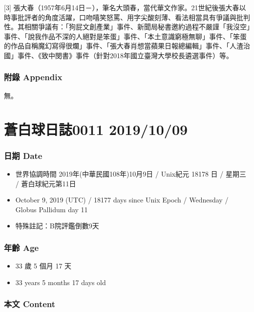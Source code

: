 \documentclass[
]{article}
\providecommand{\tightlist}{%
  \setlength{\itemsep}{0pt}\setlength{\parskip}{0pt}}
\begin{document}
{[}3{]}
張大春（1957年6月14日－），筆名大頭春，當代華文作家。21世紀後張大春以時事批評者的角度活躍，口吻嘻笑怒罵、用字尖酸刻薄、看法相當具有爭議與批判性。其相關爭議有：「狗屁文創產業」事件、新聞局秘書邀約過程不嚴謹「我沒空」事件、「說我作品不深的人絕對是笨蛋」事件、「本土意識窮極無聊」事件、「笨蛋的作品自稱魔幻寫得很爛」事件、「張大春肖想當蘋果日報總編輯」事件、「人渣治國」事件、《致中閔書》事件（針對2018年國立臺灣大學校長遴選事件）等。

\hypertarget{ux9644ux9304-appendix-3}{%
\subsubsection{附錄 Appendix}\label{ux9644ux9304-appendix-3}}

無。

\hypertarget{ux84bcux767dux7403ux65e5ux8a8c0011-20191009}{%
\section{蒼白球日誌0011
2019/10/09}\label{ux84bcux767dux7403ux65e5ux8a8c0011-20191009}}

\hypertarget{ux65e5ux671f-date-10}{%
\subsubsection{日期 Date}\label{ux65e5ux671f-date-10}}

\begin{itemize}
\tightlist
\item
  世界協調時間 2019年(中華民國108年)10月9日 / Unix紀元 18178 日 / 星期三
  / 蒼白球紀元第11日
\item
  October 9, 2019 (UTC) / 18177 days since Unix Epoch / Wednesday /
  Globus Pallidum day 11
\item
  特殊註記：B院評鑑倒數9天
\end{itemize}

\hypertarget{ux5e74ux9f61-age-10}{%
\subsubsection{年齡 Age}\label{ux5e74ux9f61-age-10}}

\begin{itemize}
\tightlist
\item
  33 歲 5 個月 17 天
\item
  33 years 5 months 17 days old
\end{itemize}

\hypertarget{ux672cux6587-content-10}{%
\subsubsection{本文 Content}\label{ux672cux6587-content-10}}
\end{document}
